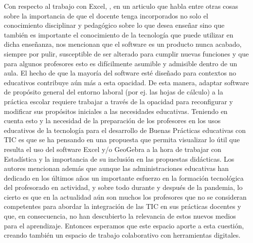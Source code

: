 Con respecto al trabajo con Excel, \textcite{valverde10}, en un articulo que habla entre otras cosas sobre la importancia de que el docente tenga incorporados no solo el conocimiento disciplinar y pedagógico sobre lo que desea enseñar sino que también es importante el conocimiento de la tecnología que puede utilizar en dicha enseñanza, nos mencionan que el software es un producto nunca acabado, siempre por pulir, susceptible de ser alterado para cumplir nuevas funciones y que para algunos profesores esto es difícilmente asumible y admisible dentro de un aula. El hecho de que la mayoría del software esté diseñado para contextos no educativos contribuye aún más a esta opacidad. De esta manera, adaptar software de propósito general del entorno laboral (por ej. las hojas de cálculo) a la práctica escolar requiere trabajar a través de la opacidad para reconfigurar y modificar sus propósitos iniciales a las necesidades educativas. Teniendo en cuenta esto y la necesidad de la preparación de los profesores en los usos educativos de la tecnología para el desarrollo de Buenas Prácticas educativas con TIC es que se ha pensando en una propuesta que permita visualizar lo útil que resulta el uso del software Excel y/o GeoGebra a la hora de trabajar con Estadística y la importancia de su inclusión en las propuestas didácticas. Los autores mencionan además que aunque las administraciones educativas han dedicado en los últimos años un importante esfuerzo en la formación tecnológica del profesorado en actividad, y sobre todo durante y después de la pandemia, lo cierto es que en la actualidad aún son muchos los profesores que no se consideran competentes para abordar la integración de las TIC en sus prácticas docentes y que, en consecuencia, no han descubierto la relevancia de estos nuevos medios para el aprendizaje. Entonces esperamos que este espacio aporte a esta cuestión, creando también un espacio de trabajo colaborativo con herramientas digitales. 

